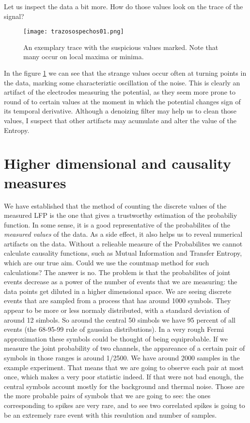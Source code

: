 \documentclass[10pt]{article}
\begin{document}
Let us inspect the data a bit more. How do those values look on the trace of
the signal?

\begin{figure}
  \begin{center}
    \texttt{[image: trazosospechos01.png]}
  \end{center}
  \caption{An exemplary trace with the suspicious values marked. Note that
  many occur on local maxima or minima.}
  \label{trazomarcas01}
\end{figure}

In the figure \ref{trazomarcas01} we can see that the strange values occur often
at turning points in the data, marking some characteriztic oscillation of the noise.
This is clearly an artifact of the electrodes measuring the potential, as they
seem more prone to round of to certain values at the moment in which the
potential changes sign of its temporal derivative. Although a denoizing filter may
help us to clean those values, I suspect that other artifacts may acumulate and
alter the value of the Entropy.


\section{Higher dimensional and causality measures}

We have established that the method of counting the discrete values of
the measured LFP is the one that gives a trustworthy estimation of the
probabiliy function. In some sense, it is a good representative
of the probabilites of the \emph{measured values} of the data.
As a side effect, it also helps us to reveal numerical artifacts
on the data. Without a relieable measure of the Probabilites
we cannot  calculate causality functions, such as Mutual Information and
Transfer Entropy, which are our true aim.
Could we use the countmap method for such calculations?
The answer is no. The problem is that the probabilites of joint events
decrease as a power of the number of events that we are measuring: the data
points get diluted in a higher dimensional space. We are seeing
discrete events that are sampled from a process that has around 1000 symbols.
They appear to be more or less normaly distributed, with a standard deviation
of around 12 simbols. So around the central 50 simbols we have 95 percent of all
events (the 68-95-99 rule of gaussian distributions).
In a very rough Fermi approximation these symbols could be thought of being
equiprobable. If we measure the joint probability of two channels,
the appareance of a certain pair
of symbols in those ranges is around 1/2500. We have around 2000 samples in
the example experiment. That means that we are going to observe each pair
at most once, which makes a very poor statistic indeed.
If that were not bad enough,
the central symbols account mostly for the background and thermal noise.
Those are the more probable pairs of symbols that we are going to see: the
ones corresponding to spikes are very rare, and to see
two correlated spikes is going to be an extremely rare event with this
resulution and number of samples.
\end{document}
